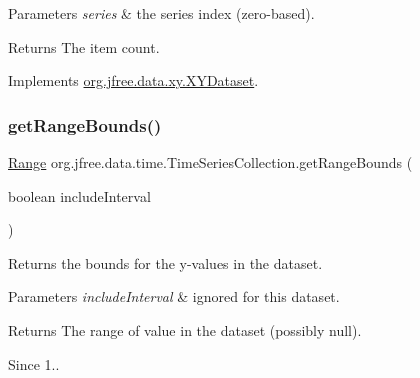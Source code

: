 \begin{DoxyParams}{Parameters}
{\em series} & the series index (zero-\/based).\\
\hline
\end{DoxyParams}
\begin{DoxyReturn}{Returns}
The item count. 
\end{DoxyReturn}


Implements \mbox{\hyperlink{interfaceorg_1_1jfree_1_1data_1_1xy_1_1_x_y_dataset_ae81f9de91dfcae45028fc8a486a119da}{org.\+jfree.\+data.\+xy.\+X\+Y\+Dataset}}.

\mbox{\label{classorg_1_1jfree_1_1data_1_1time_1_1_time_series_collection_a7fbccedea041dde90def01addb148752}} 
\subsubsection{\texorpdfstring{get\+Range\+Bounds()}{getRangeBounds()}\hspace{0.1cm}{\footnotesize\ttfamily [1/2]}}
{\footnotesize\ttfamily \mbox{\hyperlink{classorg_1_1jfree_1_1data_1_1_range}{Range}} org.\+jfree.\+data.\+time.\+Time\+Series\+Collection.\+get\+Range\+Bounds (\begin{DoxyParamCaption}\item[{boolean}]{include\+Interval }\end{DoxyParamCaption})}

Returns the bounds for the y-\/values in the dataset.


\begin{DoxyParams}{Parameters}
{\em include\+Interval} & ignored for this dataset.\\
\hline
\end{DoxyParams}
\begin{DoxyReturn}{Returns}
The range of value in the dataset (possibly {\ttfamily null}).
\end{DoxyReturn}
\begin{DoxySince}{Since}
1.. 
\end{DoxySince}
\mbox{\label{classorg_1_1jfree_1_1data_1_1time_1_1_time_series_collection_a20368e5f7344adff8aaaffe480de27b8}} 
